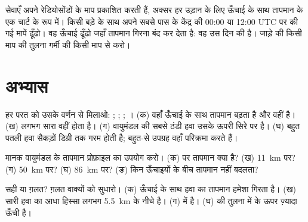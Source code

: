 \begin{inthefield}[मौसमी गुब्बारों के पीछे-पीछे]
 सेवाएँ अपने रेडियोसोंडों के माप प्रकाशित करती हैं, अक्सर हर उड़ान के लिए ऊँचाई के
साथ तापमान के एक चार्ट के रूप में। किसी बड़े के साथ अपने सबसे पास के केंद्र की
00:00 या 12:00 UTC पर की गई मापें ढूँढो। वह ऊँचाई ढूँढो जहाँ तापमान गिरना बंद कर
देता है: वह उस दिन की  है। जाड़े की किसी माप की तुलना गर्मी की किसी माप
से करो।
\end{inthefield}

\section{अभ्यास}

\begin{exercise}[$\star$]\label{exo:g8:the-atmosphere:1}
हर परत को उसके वर्णन से मिलाओ: ; ; ; । (क) वहाँ
ऊँचाई के साथ तापमान बढ़ता है और  वहीं है। (ख) लगभग सारा  वहीं होता है।
(ग) वायुमंडल की सबसे ठंडी हवा उसके ऊपरी सिरे पर है। (घ) बहुत पतली हवा सैकड़ों डिग्री
तक गरम होती है; बहुत-से उपग्रह वहाँ परिक्रमा करते हैं।
\end{exercise}

\begin{exercise}[$\star$]\label{exo:g8:the-atmosphere:2}
मानक वायुमंडल के तापमान प्रोफ़ाइल का उपयोग करो। (क)  पर तापमान क्या है?
(ख) \qty{11}{km} पर? (ग) \qty{50}{km} पर? (घ) \qty{86}{km} पर? (ङ) किन
ऊँचाइयों के बीच तापमान नहीं
बदलता?
\end{exercise}

\begin{exercise}[$\star$]\label{exo:g8:the-atmosphere:3}
सही या ग़लत? ग़लत वाक्यों को सुधारो। (क) ऊँचाई के साथ हवा का तापमान हमेशा गिरता है।
(ख) सारी हवा का आधा हिस्सा लगभग \qty{5.5}{km} के नीचे है। (ग) 
 में है। (घ)   की तुलना में  के ऊपर ज़्यादा ऊँची
है।
\end{exercise}

